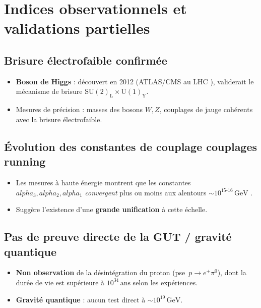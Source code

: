 \documentclass[12pt]{article}
\def\alpha{alpha}%
\begin{document}
\section{Indices observationnels et validations partielles}
\label{sec:validation}

\subsection{Brisure \'electrofaible confirm\'ee}

\begin{itemize}
    \item \textbf{Boson de Higgs} : d\'ecouvert en 2012 (ATLAS/CMS au LHC \cite{atlas2012higgs, cms2012higgs}), 
          validerait le m\'ecanisme de brisure \(\mathrm{SU}(2)_\mathrm{L}\times \mathrm{U}(1)_\mathrm{Y}\).  
    \item Mesures de pr\'ecision : masses des bosons $W, Z$, couplages de jauge coh\'erents 
          avec la brisure \'electrofaible.
\end{itemize}

\subsection{\'Evolution des constantes de couplage \og couplages running \fg}

\begin{itemize}
    \item Les mesures \`a haute \'energie montrent que 
          les constantes \(\alpha_3, \alpha_2, \alpha_1\) \emph{convergent} plus ou moins 
          aux alentours \(\sim 10^{15\text{-}16}\,\mathrm{GeV}\) \cite{amaldi1991precision}.  
    \item Sugg\`ere l'existence d'une \textbf{grande unification} \`a cette \'echelle.
\end{itemize}

\subsection{Pas de preuve directe de la GUT / gravit\'e quantique}

\begin{itemize}
    \item \textbf{Non observation} de la d\'esint\'egration du proton (pse~\(p \to e^+ \pi^0\)), 
    dont la dur\'ee de vie est sup\'erieure \`a \(10^{34}\,\mathrm{ans}\) selon les exp\'eriences.  
    \item \textbf{Gravit\'e quantique} : aucun test direct \`a \(\sim 10^{19}\,\mathrm{GeV}\).  
\end{itemize}
\end{document}
